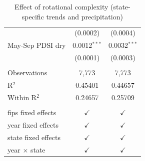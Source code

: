 \begin{table}[htbp]
{\begin{tabular}{lcc}
                                & (0.0002)                      & (0.0004)\\   
      May-Sep PDSI dry          & 0.0012$^{***}$                & 0.0032$^{***}$\\   
                                & (0.0001)                      & (0.0003)\\   
       \\
      Observations              & 7,773                         & 7,773\\  
      R$^2$                     & 0.45401                       & 0.44657\\  
      Within R$^2$              & 0.24657                       & 0.25709\\  
       \\
      fips fixed effects        & $\checkmark$                  & $\checkmark$\\   
      year fixed effects        & $\checkmark$                  & $\checkmark$\\   
      state fixed effects       & $\checkmark$                  & $\checkmark$\\   
      year $\times $ state      & $\checkmark$                  & $\checkmark$\\   
      \bottomrule
   \end{tabular}}
       \caption{\label{tab:fit4} Effect of rotational complexity (state-specific trends and precipitation)}
\end{table}


